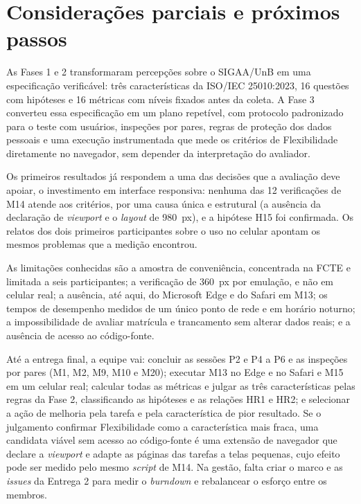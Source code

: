\section{Considerações parciais e próximos passos}
\label{sec:consideracoes}

As Fases 1 e 2 transformaram percepções sobre o SIGAA/UnB em uma especificação verificável: três características da ISO/IEC 25010:2023, 16 questões com hipóteses e 16 métricas com níveis fixados antes da coleta. A Fase 3 converteu essa especificação em um plano repetível, com protocolo padronizado para o teste com usuários, inspeções por pares, regras de proteção dos dados pessoais e uma execução instrumentada que mede os critérios de Flexibilidade diretamente no navegador, sem depender da interpretação do avaliador.

Os primeiros resultados já respondem a uma das decisões que a avaliação deve apoiar, o investimento em interface responsiva: nenhuma das 12 verificações de M14 atende aos critérios, por uma causa única e estrutural (a ausência da declaração de \textit{viewport} e o \textit{layout} de 980~px), e a hipótese H15 foi confirmada. Os relatos dos dois primeiros participantes sobre o uso no celular apontam os mesmos problemas que a medição encontrou.

As limitações conhecidas são a amostra de conveniência, concentrada na FCTE e limitada a seis participantes; a verificação de 360~px por emulação, e não em celular real; a ausência, até aqui, do Microsoft Edge e do Safari em M13; os tempos de desempenho medidos de um único ponto de rede e em horário noturno; a impossibilidade de avaliar matrícula e trancamento sem alterar dados reais; e a ausência de acesso ao código-fonte.

Até a entrega final, a equipe vai: concluir as sessões P2 e P4 a P6 e as inspeções por pares (M1, M2, M9, M10 e M20); executar M13 no Edge e no Safari e M15 em um celular real; calcular todas as métricas e julgar as três características pelas regras da Fase 2, classificando as hipóteses e as relações HR1 e HR2; e selecionar a ação de melhoria pela tarefa e pela característica de pior resultado. Se o julgamento confirmar Flexibilidade como a característica mais fraca, uma candidata viável sem acesso ao código-fonte é uma extensão de navegador que declare a \textit{viewport} e adapte as páginas das tarefas a telas pequenas, cujo efeito pode ser medido pelo mesmo \textit{script} de M14. Na gestão, falta criar o marco e as \textit{issues} da Entrega 2 para medir o \textit{burndown} e rebalancear o esforço entre os membros.
